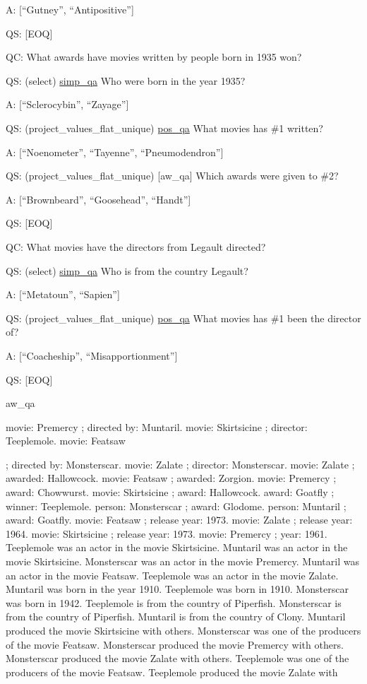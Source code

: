 \documentclass[
]{article}
\begin{document}
A: {[}``Gutney'', ``Antipositive''{]}

QS: {[}EOQ{]}

QC: What awards have movies written by people born in 1935 won?

QS: (select) \hyperref[simp_qa]{simp\_qa} Who were born in the year
1935?

A: {[}``Sclerocybin'', ``Zayage''{]}

QS: (project\_values\_flat\_unique) \hyperref[pos_qa]{pos\_qa} What
movies has \#1 written?

A: {[}``Noenometer'', ``Tayenne'', ``Pneumodendron''{]}

QS: (project\_values\_flat\_unique) {[}aw\_qa{]} Which awards were given
to \#2?

A: {[}``Brownbeard'', ``Goosehead'', ``Handt''{]}

QS: {[}EOQ{]}

QC: What movies have the directors from Legault directed?

QS: (select) \hyperref[simp_qa]{simp\_qa} Who is from the country
Legault?

A: {[}``Metatoun'', ``Sapien''{]}

QS: (project\_values\_flat\_unique) \hyperref[pos_qa]{pos\_qa} What
movies has \#1 been the director of?

A: {[}``Coacheship'', ``Misapportionment''{]}

QS: {[}EOQ{]}

aw\_qa

movie: Premercy ; directed by: Muntaril. movie: Skirtsicine ; director:
Teeplemole. movie: Featsaw

; directed by: Monsterscar. movie: Zalate ; director: Monsterscar.
movie: Zalate ; awarded: Hallowcock. movie: Featsaw ; awarded: Zorgion.
movie: Premercy ; award: Chowwurst. movie: Skirtsicine ; award:
Hallowcock. award: Goatfly ; winner: Teeplemole. person: Monsterscar ;
award: Glodome. person: Muntaril ; award: Goatfly. movie: Featsaw ;
release year: 1973. movie: Zalate ; release year: 1964. movie:
Skirtsicine ; release year: 1973. movie: Premercy ; year: 1961.
Teeplemole was an actor in the movie Skirtsicine. Muntaril was an actor
in the movie Skirtsicine. Monsterscar was an actor in the movie
Premercy. Muntaril was an actor in the movie Featsaw. Teeplemole was an
actor in the movie Zalate. Muntaril was born in the year 1910.
Teeplemole was born in 1910. Monsterscar was born in 1942. Teeplemole is
from the country of Piperfish. Monsterscar is from the country of
Piperfish. Muntaril is from the country of Clony. Muntaril produced the
movie Skirtsicine with others. Monsterscar was one of the producers of
the movie Featsaw. Monsterscar produced the movie Premercy with others.
Monsterscar produced the movie Zalate with others. Teeplemole was one of
the producers of the movie Featsaw. Teeplemole produced the movie Zalate
with
\end{document}

